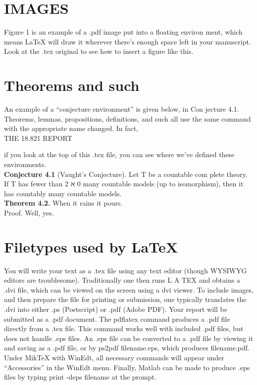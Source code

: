 \documentclass{article}
\begin{document}
	 \section{IMAGES}
	 Figure 1 is an example of a .pdf image put into a ﬂoating environ­
	 ment, which means LaTeX will draw it wherever there’s enough space
	 left in your manuscript. Look at the .tex original to see how to insert
	 a ﬁgure like this. \\
	 
	 \section{Theorems and such}
	 An example of a “conjecture environment” is given below, in Con­
	 jecture 4.1. Theorems, lemmas, propositions, deﬁnitions, and such all
	 use the same command with the appropriate name changed. In fact,
	 \\
	 \caption{THE 18.821 REPORT}
	 
	if you look at the top of this .tex ﬁle, you can see where we’ve deﬁned
	these environments.
	\\ \vspace{3mm}
	\textbf{Conjecture 4.1}
	(Vaught’s Conjecture). Let T be a countable com­
	plete theory. If T has fewer than 2 ℵ 0 many countable models (up to
	isomorphism), then it has countably many countable models.\\ \vspace{3mm}
	\textbf{Theorem 4.2.} When it rains it pours.\\ Proof. Well, yes.
	\\
	\section{Filetypes used by LaTeX}

You will write your text as a .tex ﬁle using any text editor (though
WYSIWYG editors are troublesome). Traditionally one then runs
L A TEX and obtains a .dvi ﬁle, which can be viewed on the screen using a
dvi viewer. To include images, and then prepare the ﬁle for printing or
submission, one typically translates the .dvi into either .ps (Postscript)
or .pdf (Adobe PDF).
Your report will be submitted as a .pdf document. The pdflatex
command produces a .pdf ﬁle directly from a .tex ﬁle. This command
works well with included .pdf ﬁles, but does not handle .eps ﬁles.
An .eps ﬁle can be converted to a .pdf ﬁle by viewing it and saving
as a .pdf ﬁle, or by ps2pdf filename.eps, which produces
filename.pdf. Under MikTeX with WinEdt, all necessary commands
will appear under “Accessories” in the WinEdt menu.
Finally, Matlab can be made to produce .eps ﬁles by typing
print -deps filename
at the prompt. 
\\ \vspace{3mm}
\end{document}
